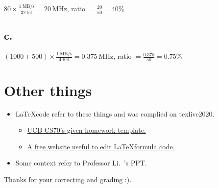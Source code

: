 \documentclass[11pt]{article}  %
\begin{document}
$80\times \frac{1~\text{MB/s}}{32~\text{bit}}  = 20~\text{MHz}$, ratio $= \frac{20}{50} = 40\%$

\subsection*{c. }

$(1000+500)\times \frac{1~\text{MB/s}}{4~\text{KB}}  = 0.375~\text{MHz}$, ratio $= \frac{0.375}{50} = 0.75\%$

\section*{Other things}

\begin{itemize}
    \item \LaTeX \space code refer to these things and was complied on texlive2020. 
    \begin{itemize}
        \item  \href{https://www.eecs70.org/assets/misc/homework_template.tex}{UCB-CS70's given homework template.} 
        \item  \href{https://www.latexlive.com}{A free website useful to edit \LaTeX \space formula code.}
    \end{itemize}
    \item Some context refer to Professor Li.~'s PPT.
\end{itemize}

    Thanks for your correcting and grading :).
\end{document}
